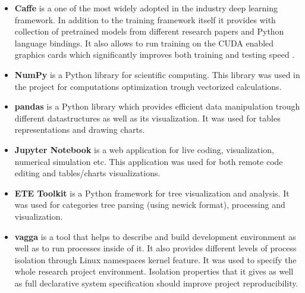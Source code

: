 \begin{itemize}
    \item \textbf{Caffe} \cite{Caffe} is a one of the most widely adopted in the industry deep learning framework. In addition to the training framework itself it provides with collection of pretrained models from different research papers \cite{CaffeModelZoo} and Python language bindings. It also allows to run training on the CUDA \cite{CUDA} enabled graphics cards which significantly improves both training and testing speed \cite{Krizhevsky2012ImageNetDNN}.
    \item \textbf{NumPy} \cite{numpy} is a Python library for scientific computing. This library was used in the project for computations optimization trough vectorized calculations.
    \item \textbf{pandas} \cite{pandas} is a Python library which provides efficient data manipulation trough different datastructures as well as its visualization. It was used for tables representations and drawing charts.
    \item \textbf{Jupyter Notebook} \cite{jupyter} is a web application for live coding, visualization, numerical simulation etc. This application was used for both remote code editing and tables/charts visualizations.
    \item \textbf{ETE Toolkit} \cite{ete3} is a Python framework for tree visualization and analysis. It was used for categories tree parsing (using newick \cite{newick} format), processing and visualization.
    \item \textbf{vagga} \cite{vagga} is a tool that helps to describe and build development environment as well as to run processes inside of it. It also provides different levels of process isolation through Linux namespaces \cite{namespaces} kernel feature. It was used to specify the whole research project environment. Isolation properties that it gives as well as full declarative system specification should improve project reproducibility.
\end{itemize}
